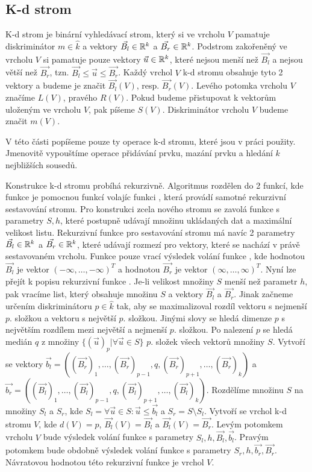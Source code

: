 \subsection{K-d strom}

K-d strom je binární vyhledávací strom, který si ve vrcholu $V$ pamatuje diskriminátor $m \in \hat k$ a vektory $\vec{B_l} \in \mathbb{R}^k$ a $\vec{B_r} \in \mathbb{R}^k$. Podstrom zakořeněný ve vrcholu $V$ si pamatuje pouze vektory $\vec{u} \in \mathbb{R}^k$, které nejsou menší než $\vec{B_l}$ a nejsou větší než $\vec{B_r}$, tzn. $\vec{B_l} \leq \vec{u} \leq \vec{B_r}$. Každý vrchol $V$ k-d stromu obsahuje tyto 2 vektory a budeme je značit $\vec{B_l}(V)$, resp. $\vec{B_r}(V)$. Levého potomka vrcholu $V$ značíme $L(V)$, pravého $R(V)$. Pokud budeme přistupovat k vektorům uloženým ve vrcholu $V$, pak píšeme $S(V)$. Diskriminátor vrcholu $V$ budeme značit $m(V)$.

V této části popíšeme pouze ty operace k-d stromu, které jsou v práci použity. Jmenovitě vypouštíme operace přidávání prvku, mazání prvku a hledání $k$ nejbližších sousedů.

Konstrukce k-d stromu probíhá rekurzivně. Algoritmus rozdělen do 2 funkcí, kde funkce  je pomocnou funkcí volajíc funkci , která provádí samotné rekurzivní sestavování stromu. Pro konstrukci zcela nového stromu se zavolá funkce  s parametry $S, h$, které postupně udávají množinu ukládaných dat a maximální velikost listu. Rekurzivní funkce  pro sestavování stromu má navíc 2 parametry $\vec{B_l} \in \mathbb{R}^k$ a $\vec{B_r} \in \mathbb{R}^k$, které udávají rozmezí pro vektory, které se nachází v právě sestavovaném vrcholu. Funkce  pouze vrací výsledek volání funkce , kde hodnotou $\vec{B_l}$ je vektor $(-\infty, \ldots, -\infty)^T$ a hodnotou $\vec{B_r}$ je vektor $(\infty, \ldots, \infty)^T$. Nyní lze přejít k popisu rekurzivní funkce . Je-li velikost množiny $S$ menší než parametr $h$, pak vracíme list, který obsahuje množinu $S$ a vektory $\vec{B_l}$ a $\vec{B_r}$. Jinak začneme určením diskriminátoru $p \in \hat k$ tak, aby se maximalizoval rozdíl vektoru s nejmenší $p.$ složkou a vektoru s největší $p.$ složkou. Jinými slovy se hledá dimenze $p$ s největším rozdílem mezi největší a nejmenší $p.$ složkou. Po nalezení $p$ se hledá medián $q$ z množiny $\{(\vec{u})_p | \forall \vec{u} \in S\}$ $p.$ složek všech vektorů množiny $S$. Vytvoří se vektory $\vec{b_l} = ((\vec{B_r})_1, \ldots, (\vec{B_r})_{p-1}, q, (\vec{B_r})_{p+1}, \ldots, (\vec{B_r})_k)$ a $\vec{b_r} = ((\vec{B_l})_1, \ldots, (\vec{B_l})_{p-1}, q, (\vec{B_l})_{p+1}, \ldots, (\vec{B_l})_k)$. Rozdělíme množinu $S$ na množiny $S_l$ a $S_r$, kde $S_l = {\forall\vec{u} \in S: \vec{u} \leq \vec{b_l}}$ a $S_r = S \setminus S_l$. Vytvoří se vrchol k-d stromu $V$, kde $d(V) = p$, $\vec{B_l}(V) = \vec{B_l}$ a $\vec{B_l}(V) = \vec{B_r}$. Levým potomkem vrcholu $V$ bude výsledek volání funkce  s parametry $S_l, h, \vec{B_l}, \vec{b_l}$. Pravým potomkem bude obdobně výsledek volání funkce  s parametry $S_r, h, \vec{b_r}, \vec{B_r}$. Návratovou hodnotou této rekurzivní funkce je vrchol $V$.

